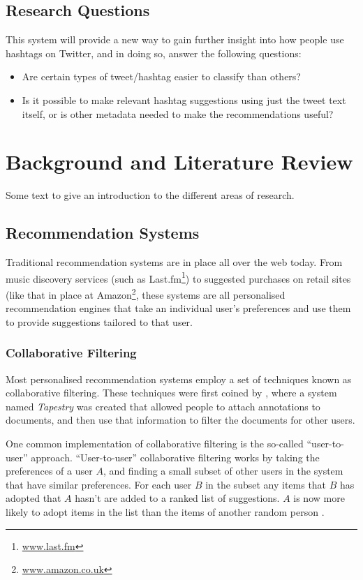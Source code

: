 \documentclass[12pt,a4paper]{article}
\begin{document}
\subsection{Research Questions}
This system will provide a new way to gain further insight into how people use hashtags on Twitter, and in doing so, answer the following questions:
\begin{itemize}
    \item Are certain types of tweet/hashtag easier to classify than others?
    \item Is it possible to make relevant hashtag suggestions using just the tweet text itself, or is other metadata needed to make the recommendations useful?
\end{itemize}
\pagebreak

\section{Background and Literature Review}
Some text to give an introduction to the different areas of research.

\subsection{Recommendation Systems}
Traditional recommendation systems are in place all over the web today. From music discovery services (such as Last.fm\footnote{\url{www.last.fm}}) to suggested purchases on retail sites (like that in place at Amazon\footnote{\url{www.amazon.co.uk}}, these systems are all personalised recommendation engines that take an individual user's preferences and use them to provide suggestions tailored to that user.

\subsubsection{Collaborative Filtering}
Most personalised recommendation systems employ a set of techniques known as collaborative filtering. These techniques were first coined by \textcite{Goldberg:1992}, where a system named \emph{Tapestry} was created that allowed people to attach annotations to documents, and then use that information to filter the documents for other users. 

One common implementation of collaborative filtering is the so-called ``user-to-user'' approach. ``User-to-user'' collaborative filtering works by taking the preferences of a user $A$, and finding a small subset of other users in the system that have similar preferences. For each user $B$ in the subset any items that $B$ has adopted that $A$ hasn't are added to a ranked list of suggestions. $A$ is now more likely to adopt items in the list than the items of another random person \parencite{Schafer:2001}.
\end{document}
